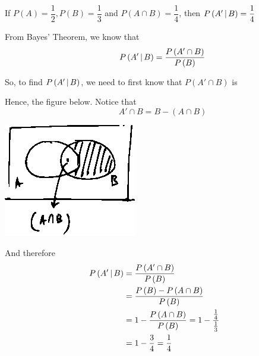 \documentclass[14pt,fleqn]{extarticle}
\newcommand\prob[1]{P \left(#1 \right)}
\begin{document}
 
\begin{snippet}
    \correct
    
    If $\prob{A} = \dfrac{1}{2}, \prob{B} = \dfrac{1}{3}$ and $\prob{A\cap B}=\dfrac{1}{4}$, then $P\left(A'\,\vert\,B\right) = \dfrac{1}{4}$ 
    
    \reason
    
    From Bayes' Theorem, we know that 
    \[\qquad \condp{A'}{B} = \dfrac{\prob{A'\cap B}}{\prob{B}} \]
    
    So, to find $P\left(A'\,\vert\,B\right)$, we need to first know that $\prob{A'\cap B}$ is \newline 
    
    Hence, the figure below. Notice that 
    \[\qquad A'\cap B = B - \left(A\cap B \right)\]
    \begin{center}
\includegraphics[scale=2]{100-A.eps}
\end{center}

And therefore 
\begin{align}
	\condp{A'}{B} &= \dfrac{\prob{A'\cap B}}{\prob{B}} \\
	&= \dfrac{\prob{B} - \prob{A\cap B}}{\prob{B}} \\
	&= 1- \dfrac{\prob{A\cap B}}{\prob{B}} = 1- \dfrac{\frac{1}{4}}{\frac{1}{3}} \\
	&= 1-\frac{3}{4} = \frac{1}{4} 
\end{align}
    
\end{snippet} 
\end{document}
